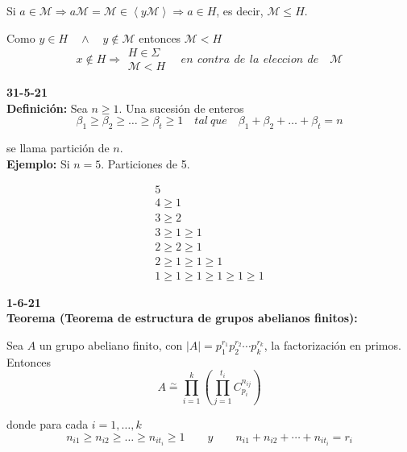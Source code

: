 \documentclass{article}
\begin{document}
\begin{enumerate}[1)]
Si $a\in \mathcal{M}\Rightarrow a\mathcal{M}=\mathcal{M}\in \left\langle y\mathcal{M}\right\rangle \Rightarrow a\in H$, es decir, $\mathcal{M}\leq H$.

Como $y\in H\quad \wedge \quad y\notin \mathcal{M}$ entonces $\mathcal{M}<H$
\begin{equation*}
x\notin H\Rightarrow \left.\begin{array}{c}
H\in \Sigma \\
\mathcal{M}<H
\end{array}\right. \quad en\:\,contra\:\,de\:\,la\:\,eleccion\:\,de\quad \mathcal{M}
\end{equation*}
\end{enumerate}

\textbf{31-5-21} \\

\textbf{Definición:} Sea $n\geq 1$. Una sucesión de enteros
\begin{equation*}
\beta_1\geq \beta_2\geq \ldots \geq \beta_t\geq 1\quad tal\:que\quad \beta_1 +\beta_2 +\ldots +\beta_t=n
\end{equation*}

se llama partición de $n$. \\

\textbf{Ejemplo:} Si $n=5$. Particiones de 5.

\begin{align*}
5\\
4\geq 1\\
3\geq 2\\
3\geq 1\geq 1\\
2\geq 2\geq 1\\
2\geq 1\geq 1\geq 1\\
1\geq 1\geq 1\geq 1\geq 1\geq 1
\end{align*}

\textbf{1-6-21}\\

\textbf{Teorema (Teorema de estructura de grupos abelianos finitos):} 

Sea $A$ un grupo abeliano finito, con $|A|=p_1^{r_1}p_2^{r_2}\cdots p_k^{r_k}$, la factorización en primos. Entonces
\begin{equation*}
A\overset{\sim}{=} \prod_{i=1}^k \left(\prod_{j=1}^{t_i} C_{p_i}^{n_{ij}}\right)
\end{equation*} 

donde para cada $i=1,\ldots,k$
\begin{equation*}
n_{i1}\geq n_{i2}\geq \ldots \geq n_{it_i}\geq 1\qquad y\qquad n_{i1}+n_{i2}+\cdots + n_{it_i}=r_i
\end{equation*}
\end{document}
